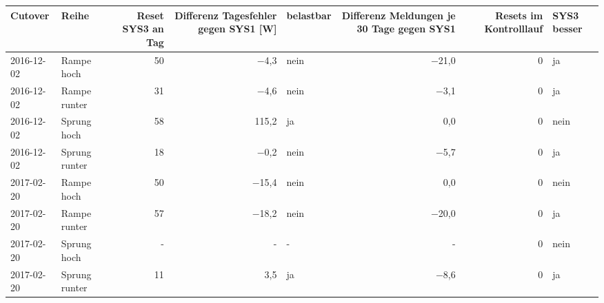 \begin{tabular}{llrrlrrl}
\toprule
Cutover & Reihe & Reset SYS3 an Tag & Differenz Tagesfehler gegen SYS1 [W] & belastbar & Differenz Meldungen je 30 Tage gegen SYS1 & Resets im Kontrolllauf & SYS3 besser \\
\midrule
2016-12-02 & Rampe hoch & 50 & $-$4,3 & nein & $-$21,0 & 0 & ja \\
2016-12-02 & Rampe runter & 31 & $-$4,6 & nein & $-$3,1 & 0 & ja \\
2016-12-02 & Sprung hoch & 58 & 115,2 & ja & 0,0 & 0 & nein \\
2016-12-02 & Sprung runter & 18 & $-$0,2 & nein & $-$5,7 & 0 & ja \\
2017-02-20 & Rampe hoch & 50 & $-$15,4 & nein & 0,0 & 0 & nein \\
2017-02-20 & Rampe runter & 57 & $-$18,2 & nein & $-$20,0 & 0 & ja \\
2017-02-20 & Sprung hoch & - & - & - & - & 0 & nein \\
2017-02-20 & Sprung runter & 11 & 3,5 & ja & $-$8,6 & 0 & ja \\
\bottomrule
\end{tabular}
